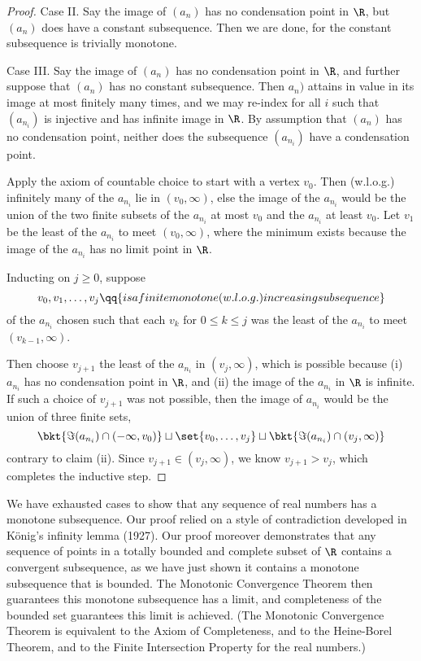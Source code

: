 \documentclass[onesided]{ccg-pset}
\begin{document}
\begin{enumerate}
\begin{proof}
    Case II. Say the image of $(a_n)$ has no condensation point in $\R$, but $(a_n)$ does have a constant subsequence. Then we are done, for the constant subsequence is trivially monotone.

    Case III. Say the image of $(a_n)$ has no condensation point in $\R$, and further suppose that $(a_n)$ has no constant subsequence. Then $a_n)$ attains in value in its image at most finitely many times, and we may re-index for all $i$ such that $(a_{n_i})$ is injective and has infinite image in $\R$. By assumption that $(a_n)$ has no condensation point, neither does the subsequence $(a_{n_i})$ have a condensation point.

    Apply the axiom of countable choice to start with a vertex $v_0$. Then (w.l.o.g.) infinitely many of the $a_{n_i}$ lie in $(v_0, \infty)$, else the image of the $a_{n_i}$ would be the union of the two finite subsets of the $a_{n_i}$ at most $v_0$ and the $a_{n_i}$ at least $v_0$. Let $v_1$ be the least of the $a_{n_i}$ to meet $(v_0, \infty)$, where the minimum exists because the image of the $a_{n_i}$ has no limit point in $\R$. 

    Inducting on $j \ge 0$, suppose 
    \begin{equation*}
        v_0, v_1, \ldots, v_j \qq{is a finite monotone (w.l.o.g.) increasing subsequence}
    \end{equation*}
     of the $a_{n_i}$ chosen such that each $v_k$ for $0 \le k \le j$ was the least of the $a_{n_i}$ to meet $(v_{k-1}, \infty)$. 

    Then choose $v_{j+1}$ the least of the $a_{n_i}$ in $(v_j, \infty)$, which is possible because (i) $a_{n_i}$ has no condensation point in $\R$, and (ii) the image of the $a_{n_i}$ in $\R$ is infinite. If such a choice of $v_{j+1}$ was not possible, then the image of $a_{n_i}$ would be the union of three finite sets, 
    \begin{equation*}
        \bkt{\Im (a_{n_i}) \cap (-\infty, v_0)} \sqcup \set{v_0, \ldots, v_j} \sqcup \bkt{\Im (a_{n_i}) \cap (v_j, \infty)}
    \end{equation*}
    contrary to claim (ii). Since $v_{j+1} \in (v_j, \infty)$, we know $v_{j+1} > v_j$, which completes the inductive step.
\end{proof}
    \begin{note}[]
        We have exhausted cases to show that any sequence of real numbers has a monotone subsequence. Our proof relied on a style of contradiction developed in K\"onig's infinity lemma (1927). Our proof moreover demonstrates that any sequence of points in a totally bounded and complete subset of $\R$ contains a convergent subsequence, as we have just shown it contains a monotone subsequence that is bounded. The Monotonic Convergence Theorem then guarantees this monotone subsequence has a limit, and completeness of the bounded set guarantees this limit is achieved. (The Monotonic Convergence Theorem is equivalent to the Axiom of Completeness, and to the Heine-Borel Theorem, and to the Finite Intersection Property for the real numbers.)
    \end{note}


\end{enumerate}
\end{document}
